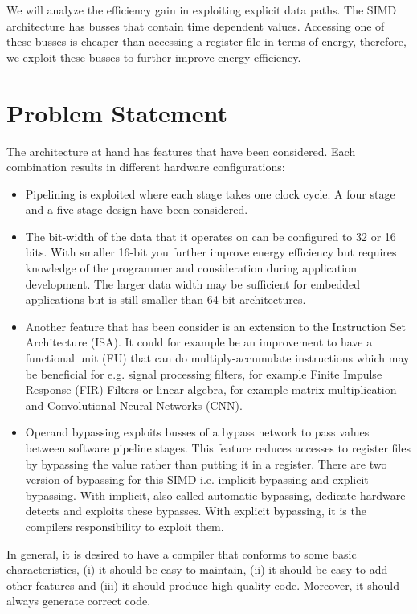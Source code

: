 We will analyze the efficiency gain in exploiting explicit data paths. The SIMD architecture has busses that contain time dependent values. Accessing one of these busses is cheaper than accessing a register file in terms of energy, therefore, we exploit these busses to further improve energy efficiency.    


\section{Problem Statement}

The architecture at hand has features that have been considered. Each combination results in different hardware configurations:
\begin{itemize}
\item Pipelining is exploited where each stage takes one clock cycle. A four stage and a five stage design have been considered.
\item	The bit-width of the data that it operates on can be configured to 32 or 16 bits. With smaller 16-bit you further improve energy efficiency but requires knowledge of the programmer and consideration during application development. The larger data width may be sufficient for embedded applications but is still smaller than 64-bit architectures.
\item	Another feature that has been consider is an extension to the Instruction Set Architecture (ISA). It could for example be an improvement to have a functional unit (FU) that can do multiply-accumulate instructions which may be beneficial for e.g. signal processing filters, for example Finite Impulse Response (FIR) Filters or linear algebra, for example matrix multiplication and Convolutional Neural Networks (CNN). 
\item Operand bypassing exploits busses of a bypass network to pass values between software pipeline stages. This feature reduces accesses to register files by bypassing the value rather than putting it in a register. There are two version of bypassing for this SIMD i.e. implicit bypassing and explicit bypassing. With implicit, also called automatic bypassing, dedicate hardware detects and exploits these bypasses. With explicit bypassing, it is the compilers responsibility to exploit them.
\end{itemize}

In general, it is desired to have a compiler that conforms to some basic characteristics, (i) it should be easy to maintain, (ii) it should be easy to add other features and (iii) it should produce high quality code. Moreover, it should always generate correct code.

